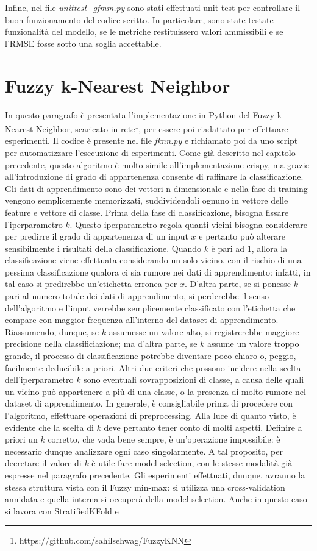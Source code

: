 \documentclass[11pt,  oneside, openany]{book}
\begin{document}
 
Infine, nel file \textit {unittest\_gfmm.py} sono stati effettuati unit test per controllare il buon funzionamento del codice scritto. In particolare, sono state testate funzionalità del modello, se le metriche restituissero valori ammissibili e se l'RMSE fosse sotto una soglia accettabile. 


	\section{Fuzzy k-Nearest Neighbor}
In questo paragrafo è presentata l'implementazione in Python del Fuzzy k-Nearest Neighbor, scaricato in rete\footnote{https://github.com/sahilsehwag/FuzzyKNN}, per essere poi riadattato per effettuare esperimenti. Il codice è presente nel file \textit{fknn.py} e richiamato poi da uno script per automatizzare l'esecuzione di esperimenti. Come già descritto nel capitolo precedente, questo algoritmo è molto simile all'implementazione crispy, ma grazie all'introduzione di grado di appartenenza consente di raffinare la classificazione. Gli dati di apprendimento sono dei vettori n-dimensionale e nella fase di training vengono semplicemente memorizzati, suddividendoli ognuno in vettore delle feature e vettore di classe. Prima della fase di classificazione, bisogna fissare l'iperparametro $k$. Questo iperparametro regola quanti vicini bisogna considerare per predirre il grado di appartenenza di un input $x$ e pertanto può alterare sensibilmente i risultati della classificazione. Quando $k$ è pari ad 1, allora la classificazione viene effettuata considerando un solo vicino, con il rischio di una pessima classificazione qualora ci sia rumore nei dati di apprendimento: infatti, in tal caso si predirebbe un'etichetta erronea per $x$. D'altra parte, se si ponesse $k$ pari al numero totale dei dati di apprendimento, si perderebbe il senso dell'algoritmo e l'input verrebbe semplicemente classificato con l'etichetta che compare con maggior frequenza all'interno del dataset di apprendimento. Riassumendo, dunque, se $k$ assumesse un valore alto, si registrerebbe maggiore precisione nella classificiazione; ma d'altra parte, se $k$ assume un valore troppo grande, il processo di classificazione potrebbe diventare poco chiaro o, peggio, facilmente deducibile a priori. Altri due criteri che possono incidere nella scelta dell'iperparametro $k$  sono eventuali sovrapposizioni di classe, a causa delle quali un vicino può appartenere a più di una classe, o la presenza di molto rumore nel dataset di apprendimento. In generale, è consigliabile prima di procedere con l'algoritmo, effettuare operazioni di preprocessing. Alla luce di quanto visto, è evidente che la scelta di $k$ deve pertanto tener conto di molti aspetti. Definire a priori un $k$ corretto, che vada bene sempre, è un'operazione impossibile: è necessario dunque analizzare ogni caso singolarmente. A tal proposito, per decretare il valore di $k$ è utile fare model selection, con le stesse modalità già espresse nel paragrafo precedente. Gli esperimenti effettuati, dunque, avranno la stessa struttura vista con il Fuzzy min-max: si utilizza una cross-validation annidata e quella interna si occuperà della model selection. Anche in questo caso si lavora con StratifiedKFold e 
\end{document}
